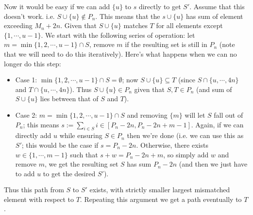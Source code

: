 \documentclass[11pt,a4paper]{article}
\begin{document}
\begin{enumerate}
    	Now it would be easy if we can add $\{u\}$ to $s$ directly to get $S'$. 
    	Assume that this doesn't work. 
    	i.e. $S \cup \{u\}\not\in P_n$. 
    	This means that the $s\cup \{u\}$ has sum of element exceeding $M_n + 2n$. 
    	Given that $S\cup\{u\}$ matches $T$ for all elements except $\{1, \cdots, u - 1\}$. 
    	We start with the following series of operation: let $m = \min \{1, 2, \cdots, u - 1\}\cap S$, 
    	remove $m$ if the resulting set is still in $P_n$ 
    	(note that we will need to do this iteratively). 
    	Here's what happens when we can no longer do this step: 
    	\begin{itemize}
    		\item Case 1: $\min \{1, 2, \cdots, u - 1\}\cap S = \emptyset$; 
    		now $S\cup \{u\}\subseteq T$ (since $S\cap \{u, \cdots, 4n\}$ and $T\cap \{u, \cdots, 4n\}$). 
    		Thus $S\cup \{u\}\in P_n$ given that $S, T\in P_n$ (and sum of $S\cup \{u\}$ lies between that of $S$ and $T$). 
    		
    		\item Case 2: $m = \min \{1, 2, \cdots, u - 1\}\cap S$ and removing $\{m\}$ will let $S$ fall out of $P_n$; 
    		this means $s := \sum_{i\in S} i \in [P_n - 2n, P_n - 2n + m - 1]$. 
    		Again, if we can directly add $u$ while ensuring $S\in P_n$ then we're done (i.e. we can use this as $S'$; 
    		this would be the case if $s = P_n - 2n$. 
    		Otherwise, there exists $w\in \{1, \cdots, m - 1\}$ such that $s + w = P_n - 2n + m$, 
    		so simply add $w$ and remove $m$, 
    		we get the resulting set $S$ has sum $P_n - 2n$ (and then we just have to add $u$ to get the desired $S
    		'$). 
    		
    	\end{itemize}
    	Thus this path from $S$ to $S'$ exists, with strictly smaller largest mismatched element with respect to $T$. 
    	Repeating this argument we get a path eventually to $T$.
    \end{enumerate}
    
\end{document}
